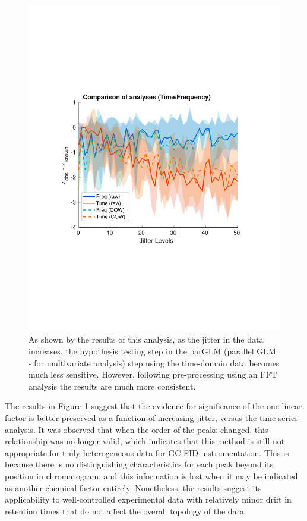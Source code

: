 \documentclass[preprint,12pt]{elsarticle}
\begin{document}
\begin{figure}[hbt!]
    \centering
    \includegraphics[width=0.9\linewidth]{comparison.pdf}
    \caption{As shown by the results of this analysis, as the jitter in the data increases, the hypothesis testing step in the parGLM (parallel GLM - for multivariate analysis) step using the time-domain data becomes much less sensitive. However, following pre-processing using an FFT analysis the results are much more consistent.}
    \label{fig:compare}
\end{figure}

The results in Figure \ref{fig:compare} suggest that the evidence for significance of the one linear factor is better preserved as a function of increasing jitter, versus the time-series analysis. It was observed that when the order of the peaks changed, this relationship was no longer valid, which indicates that this method is still not appropriate for truly heterogeneous data for GC-FID instrumentation. This is because there is no distinguishing characteristics for each peak beyond its position in chromatogram, and this information is lost when it may be indicated as another chemical factor entirely. Nonetheless, the results suggest its applicability to well-controlled experimental data with relatively minor drift in retention times that do not affect the overall topology of the data.
\end{document}
